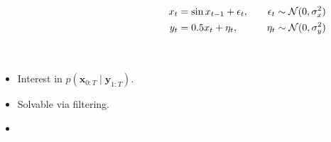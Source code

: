 \documentclass{beamer}
\newcommand{\bx}{\bm{x}}
\newcommand{\by}{\bm{y}}
\newcommand{\btheta}{\bm{\theta}}
\newcommand{\obs}{g}
\newcommand{\dx}[1]{\mathrm{d}{#1}}
\begin{document}
\begin{frame}
\begin{columns}
\begin{column}{0.5\textwidth}
\begin{figure}[ht]
{
                }
                \label{fig:graphical-model1}
            \end{figure}            
        \end{column}
%
        \begin{column}{0.5\textwidth}
            \begin{alignat*}{2}
            x_t & = \sin x_{t-1} + \epsilon_t, \quad & \epsilon_t \sim \mathcal{N}(0, \sigma_x^2) \\
            y_t & = 0.5 x_t + \eta_t, \quad & \eta_t \sim \mathcal{N}(0, \sigma_y^2) \\
            \textcolor{white}{\btheta} & \textcolor{white}{=} \textcolor{white}{\left(c, \sigma_x^2, \sigma_y^2\right)^\intercal} &
            \end{alignat*}
        \end{column}
    \end{columns}

    \begin{itemize}
        \item Interest in $p(\bx_{0:T} \mid \by_{1:T})$.
        \item Solvable via filtering.
        \item[\textcolor{white}{\textbullet}] \textcolor{white}{$p(\by_{1:T} \mid \btheta) = \int p(\bx_{0:T}, \by_{1:T} \mid \btheta) \; \dx{\bx_{0:T}}$ intractable in general.}
    \end{itemize}
    \end{frame}
\end{document}
